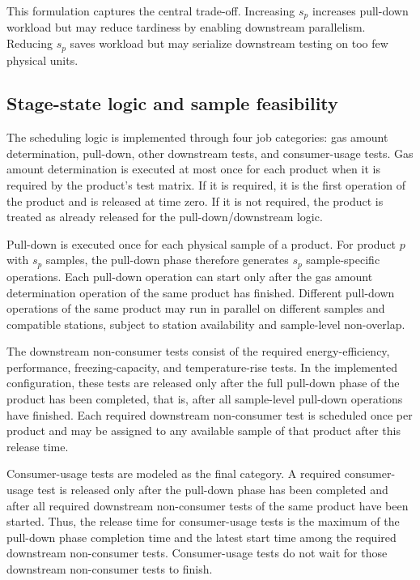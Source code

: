 \documentclass[11pt]{article}
\begin{document}
This formulation captures the central trade-off. Increasing \(s_p\) increases pull-down workload but may reduce tardiness by enabling downstream parallelism. Reducing \(s_p\) saves workload but may serialize downstream testing on too few physical units.

\subsection{Stage-state logic and sample feasibility}
\label{subsec:stage_logic}

The scheduling logic is implemented through four job categories: gas amount determination, pull-down, other downstream tests, and consumer-usage tests. Gas amount determination is executed at most once for each product when it is required by the product's test matrix. If it is required, it is the first operation of the product and is released at time zero. If it is not required, the product is treated as already released for the pull-down/downstream logic.

Pull-down is executed once for each physical sample of a product. For product \(p\) with \(s_p\) samples, the pull-down phase therefore generates \(s_p\) sample-specific operations. Each pull-down operation can start only after the gas amount determination operation of the same product has finished. Different pull-down operations of the same product may run in parallel on different samples and compatible stations, subject to station availability and sample-level non-overlap.

The downstream non-consumer tests consist of the required energy-efficiency, performance, freezing-capacity, and temperature-rise tests. In the implemented configuration, these tests are released only after the full pull-down phase of the product has been completed, that is, after all sample-level pull-down operations have finished. Each required downstream non-consumer test is scheduled once per product and may be assigned to any available sample of that product after this release time.

Consumer-usage tests are modeled as the final category. A required consumer-usage test is released only after the pull-down phase has been completed and after all required downstream non-consumer tests of the same product have been started. Thus, the release time for consumer-usage tests is the maximum of the pull-down phase completion time and the latest start time among the required downstream non-consumer tests. Consumer-usage tests do not wait for those downstream non-consumer tests to finish.
\end{document}
